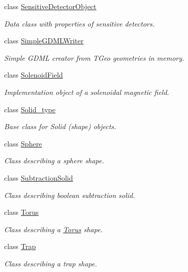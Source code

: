 \begin{DoxyCompactItemize}
class \hyperlink{class_d_d4hep_1_1_geometry_1_1_sensitive_detector_object}{Sensitive\+Detector\+Object}
\begin{DoxyCompactList}\small\item\em Data class with properties of sensitive detectors. \end{DoxyCompactList}\item 
class \hyperlink{class_d_d4hep_1_1_geometry_1_1_simple_g_d_m_l_writer}{Simple\+G\+D\+M\+L\+Writer}
\begin{DoxyCompactList}\small\item\em Simple G\+D\+ML creator from T\+Geo geometries in memory. \end{DoxyCompactList}\item 
class \hyperlink{class_d_d4hep_1_1_geometry_1_1_solenoid_field}{Solenoid\+Field}
\begin{DoxyCompactList}\small\item\em Implementation object of a solenoidal magnetic field. \end{DoxyCompactList}\item 
class \hyperlink{class_d_d4hep_1_1_geometry_1_1_solid__type}{Solid\+\_\+type}
\begin{DoxyCompactList}\small\item\em Base class for Solid (shape) objects. \end{DoxyCompactList}\item 
class \hyperlink{class_d_d4hep_1_1_geometry_1_1_sphere}{Sphere}
\begin{DoxyCompactList}\small\item\em Class describing a sphere shape. \end{DoxyCompactList}\item 
class \hyperlink{class_d_d4hep_1_1_geometry_1_1_subtraction_solid}{Subtraction\+Solid}
\begin{DoxyCompactList}\small\item\em Class describing boolean subtraction solid. \end{DoxyCompactList}\item 
class \hyperlink{class_d_d4hep_1_1_geometry_1_1_torus}{Torus}
\begin{DoxyCompactList}\small\item\em Class describing a \hyperlink{class_d_d4hep_1_1_geometry_1_1_torus}{Torus} shape. \end{DoxyCompactList}\item 
class \hyperlink{class_d_d4hep_1_1_geometry_1_1_trap}{Trap}
\begin{DoxyCompactList}\small\item\em Class describing a trap shape. \end{DoxyCompactList}\item 

\end{DoxyCompactItemize}
